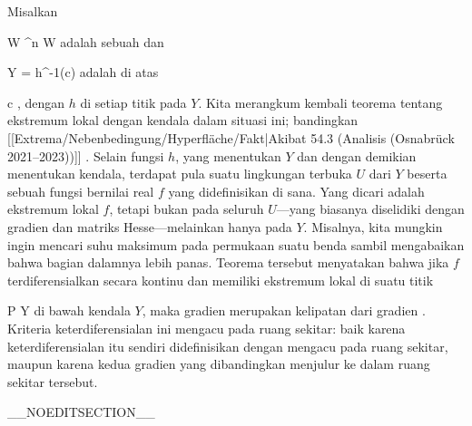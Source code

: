 {}
{

Misalkan

\mavergleichskette
{\vergleichskette
{ W
}
{ \subseteq }{ \R^n
}
{  }{
}
{    }{
}
{   }{
}
}
{}{}{}
 { W } { \R
} {}
adalah sebuah
dan

\mavergleichskette
{\vergleichskette
{ Y
}
{ = }{ h^{-1}(c)
}
{  }{
}
{    }{
}
{   }{
}
}
{}{}{}
adalah
di atas

\mavergleichskette
{\vergleichskette
{ c
}
{ \in }{ \R
}
{  }{
}
{    }{
}
{   }{
}
}
{}{}{,}
dengan $h$
di setiap titik pada $Y$. Kita merangkum kembali teorema tentang ekstremum lokal dengan kendala dalam situasi ini; bandingkan
[[Extrema/Nebenbedingung/Hyperfläche/Fakt|Akibat 54.3 (Analisis (Osnabrück 2021--2023))]]
 {} {.}
Selain fungsi $h$, yang menentukan $Y$ dan dengan demikian menentukan kendala, terdapat pula suatu lingkungan terbuka $U$ dari $Y$ beserta sebuah fungsi bernilai real $f$ yang didefinisikan di sana. Yang dicari adalah ekstremum lokal $f$, tetapi bukan pada seluruh $U$---yang biasanya diselidiki dengan gradien dan matriks Hesse---melainkan hanya pada $Y$. Misalnya, kita mungkin ingin mencari suhu maksimum pada permukaan suatu benda sambil mengabaikan bahwa bagian dalamnya lebih panas. Teorema tersebut menyatakan bahwa jika $f$ terdiferensialkan secara kontinu dan memiliki ekstremum lokal di suatu titik

\mavergleichskette
{\vergleichskette
{ P
}
{ \in }{ Y
}
{  }{
}
{    }{
}
{   }{
}
}
{}{}{}
di bawah kendala $Y$, maka gradien
 merupakan kelipatan dari gradien
. Kriteria keterdiferensialan ini mengacu pada ruang sekitar: baik karena keterdiferensialan itu sendiri didefinisikan dengan mengacu pada ruang sekitar, maupun karena kedua gradien yang dibandingkan menjulur ke dalam ruang sekitar tersebut.

}

__NOEDITSECTION__

